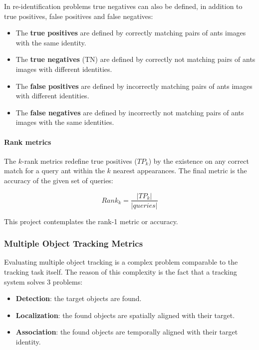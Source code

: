 {
    In re-identification problems true negatives can also be defined, in addition to true positives, false positives and false negatives:
}

\begin{itemize}
    \item The \textbf{true positives} are defined by correctly matching pairs of ants images with the same identity.
    \item The \textbf{true negatives} (\acs{TN}) are defined by correctly not matching pairs of ants images with different identities.
    \item The \textbf{false positives} are defined by incorrectly matching pairs of ants images with different identities.
    \item The \textbf{false negatives} are defined by incorrectly not matching pairs of ants images with the same identities.
\end{itemize}

\paragraph{Rank metrics}

{
    The $k$-rank metrics redefine true positives (${TP}_{k}$) by the existence on any correct match for a query ant within the $k$ nearest appearances.
    The final metric is the accuracy of the given set of queries:
}

\begin{equation}
    \label{eqn:rank accuracy}
    Rank_{k} = \frac{|{TP}_{k}|}{|queries|}
\end{equation}

{
    This project contemplates the rank-1 metric or accuracy.
}

\needspace{0.15\textheight}

\subsubsection{Multiple Object Tracking Metrics}

{
    Evaluating multiple object tracking is a complex problem comparable to the tracking task itself. 
    The reason of this complexity is the fact that a tracking system solves 3 problems:
}

\begin{itemize}
    \item \textbf{Detection}: the target objects are found. %
    \item \textbf{Localization}: the found objects are spatially aligned with their target. %
    \item \textbf{Association}: the found objects are temporally aligned with their target identity.
\end{itemize}

